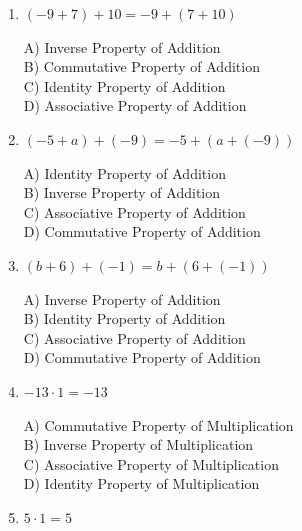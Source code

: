 \documentclass[11pt]{article}
\begin{document}
\begin{enumerate}
\begin{minipage}{\linewidth}
C) Associative Property of Multiplication \\
D) Inverse Property of Multiplication
\end{minipage}
  \vspace{0.3cm}
  \item $(-9 + 7) + 10 = -9 + (7 + 10)$
\\[2pt]
\begin{minipage}{\linewidth}
A) Inverse Property of Addition \\
B) Commutative Property of Addition \\
C) Identity Property of Addition \\
D) Associative Property of Addition
\end{minipage}
  \vspace{0.3cm}
  \item $(-5 + a) + (-9) = -5 + (a + (-9))$
\\[2pt]
\begin{minipage}{\linewidth}
A) Identity Property of Addition \\
B) Inverse Property of Addition \\
C) Associative Property of Addition \\
D) Commutative Property of Addition
\end{minipage}
  \vspace{0.3cm}
  \item $(b + 6) + (-1) = b + (6 + (-1))$
\\[2pt]
\begin{minipage}{\linewidth}
A) Inverse Property of Addition \\
B) Identity Property of Addition \\
C) Associative Property of Addition \\
D) Commutative Property of Addition
\end{minipage}
  \vspace{0.3cm}
  \item $-13 \cdot 1 = -13$
\\[2pt]
\begin{minipage}{\linewidth}
A) Commutative Property of Multiplication \\
B) Inverse Property of Multiplication \\
C) Associative Property of Multiplication \\
D) Identity Property of Multiplication
\end{minipage}
  \vspace{0.3cm}
  \item $5 \cdot 1 = 5$

\end{enumerate}
\end{document}
